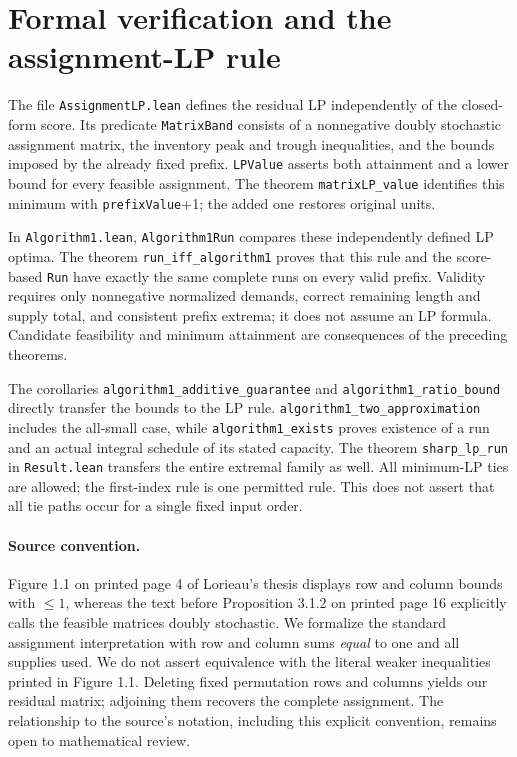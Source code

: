 \documentclass[11pt]{article}
\begin{document}
\section{Formal verification and the assignment-LP rule}\label{app:verification}
The file \texttt{AssignmentLP.lean} defines the residual LP independently
of the closed-form score. Its predicate \texttt{MatrixBand} consists of a
nonnegative doubly stochastic assignment matrix, the inventory peak and
trough inequalities, and the bounds imposed by the already fixed prefix.
\texttt{LPValue} asserts both attainment and a lower bound for every feasible
assignment. The theorem \texttt{matrixLP\_value} identifies this minimum with
\texttt{prefixValue}+1; the added one restores original units.

In \texttt{Algorithm1.lean}, \texttt{Algorithm1Run} compares these independently
defined LP optima. The theorem \texttt{run\_iff\_algorithm1} proves that this
rule and the score-based \texttt{Run} have exactly the same complete
runs on every valid prefix. Validity requires only nonnegative normalized
demands, correct remaining length and supply total, and consistent prefix
extrema; it does not assume an LP formula. Candidate feasibility and minimum
attainment are consequences of the preceding theorems.

The corollaries \texttt{algorithm1\_additive\_guarantee} and
\texttt{algorithm1\_ratio\_bound} directly transfer the bounds to the LP rule.
\texttt{algorithm1\_two\_approximation} includes the all-small case, while
\texttt{algorithm1\_exists} proves existence of a run and an actual integral
schedule of its stated capacity. The theorem \texttt{sharp\_lp\_run} in
\texttt{Result.lean} transfers the entire extremal family as well.
All minimum-LP ties are allowed; the first-index rule is one permitted rule.
This does not assert that all tie paths occur for a single fixed input order.

\paragraph{Source convention.}
Figure 1.1 on printed page 4 of Lorieau's thesis displays row and column
bounds with $\le1$, whereas the text before Proposition 3.1.2 on printed
page 16 explicitly calls the feasible matrices doubly stochastic.
We formalize the standard assignment interpretation with row and column sums
\emph{equal} to one and all supplies used. We do not assert equivalence with
the literal weaker inequalities printed in Figure 1.1. Deleting fixed
permutation rows and columns yields our residual matrix; adjoining them
recovers the complete assignment. The relationship to the source's notation,
including this explicit convention, remains open to mathematical review.
\end{document}
